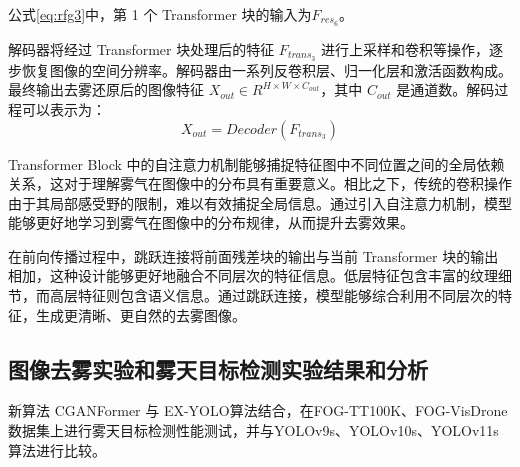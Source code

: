 公式\ref{eq:rfg3}中，第 1 个 Transformer 块的输入为$F_{res_6}$。

解码器将经过 Transformer 块处理后的特征 $F_{trans_3}$ 进行上采样和卷积等操作，逐步恢复图像的空间分辨率。解码器由一系列反卷积层、归一化层和激活函数构成。最终输出去雾还原后的图像特征 $X_{out} \in R^{H \times W \times C_{out}}$，其中 $C_{out}$ 是通道数。解码过程可以表示为：
\begin{equation}
    \label{eq:rfg4}
    X_{out} = Decoder(F_{trans_3})
\end{equation}


Transformer Block 中的自注意力机制能够捕捉特征图中不同位置之间的全局依赖关系，这对于理解雾气在图像中的分布具有重要意义。相比之下，传统的卷积操作由于其局部感受野的限制，难以有效捕捉全局信息。通过引入自注意力机制，模型能够更好地学习到雾气在图像中的分布规律，从而提升去雾效果。

在前向传播过程中，跳跃连接将前面残差块的输出与当前 Transformer 块的输出相加，这种设计能够更好地融合不同层次的特征信息。低层特征包含丰富的纹理细节，而高层特征则包含语义信息。通过跳跃连接，模型能够综合利用不同层次的特征，生成更清晰、更自然的去雾图像。

\subsection{图像去雾实验和雾天目标检测实验结果和分析}



新算法 CGANFormer 与 EX-YOLO算法结合，在FOG-TT100K、FOG-VisDrone数据集上进行雾天目标检测性能测试，并与YOLOv9s\cite{yolov9}、YOLOv10s\cite{yolov10}、YOLOv11s\cite{yolov11}算法进行比较。



